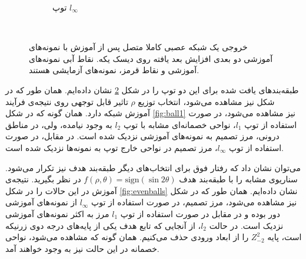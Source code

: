 \documentclass[12pt,onecolumn,a4paper]{article}
\begin{document}
\begin{figure}
\begin{subfigure}[b]{0.45\textwidth}
		\caption{توپ $l_\infty$}
		\label{fig:ballinf}
	\end{subfigure}
	~ %
	\caption{
		خروجی یک شبکه عصبی کاملا متصل پس از آموزش با نمونه‌های آموزشی دو بعدی افزایش بعد یافته روی دیسک یکه. نقاط آبی نمونه‌های آموزشی و نقاط قرمز، نمونه‌های آزمایشی هستند.
	}
	\label{fig:balls}
\end{figure}

طبقه‌بندهای یافت شده برای این دو توپ را در شکل \ref{fig:balls} نشان داده‌ایم. همان طور که در شکل نیز مشاهده می‌شود، انتخاب توزیع $\rho$ تاثیر قابل توجهی روی نتیجه‌ی فرآیند آموزش شبکه دارد. همان گونه که در شکل \ref{fig:ball1} نیز مشاهده می‌شود، در صورت استفاده از توپ $l_1$، نواحی خصمانه‌ای مشابه با توپ $l_2$ به وجود نیامده، ولی، در مناطق درونی، مرز تصمیم به نمونه‌های آموزشی نزدیک شده است. در مقابل، در صورت استفاده از توپ $l_\infty$، مرز تصمیم در نواحی خارج توپ به نمونه‌ها نزدیک شده است.

می‌توان نشان داد که رفتار فوق برای انتخاب‌های دیگر طبقه‌بند هدف نیز تکرار می‌شود. سناریوی مشابه را با طبقه‌بند هدف 
$f(\rho,\theta)=\mathrm{sign}(\sin2\theta)$ 
در نظر بگیرید. نتیجه‌ی آموزش در این حالات را در شکل \ref{fig:evenballs} نشان داده‌ایم. همان طور که در شکل نیز مشاهده می‌شود، مرز تصمیم، در صورت استفاده از توپ $l_\infty$ از نمونه‌های آموزشی دور بوده و در مقابل در صورت استفاده از توپ $l_1$ مرز به اکثر نمونه‌های آموزشی نزدیک است. در حالت $l_2$، از آنجایی که تابع هدف یکی از پایه‌های درجه دوی زرنیکه است، پایه $Z_{-2}^{2}$ را از ابعاد ورودی حذف می‌کنیم. همان گونه که مشاهده می‌شود، نواحی خصمانه در این حالت نیز به وجود خواهند آمد.
\end{document}
